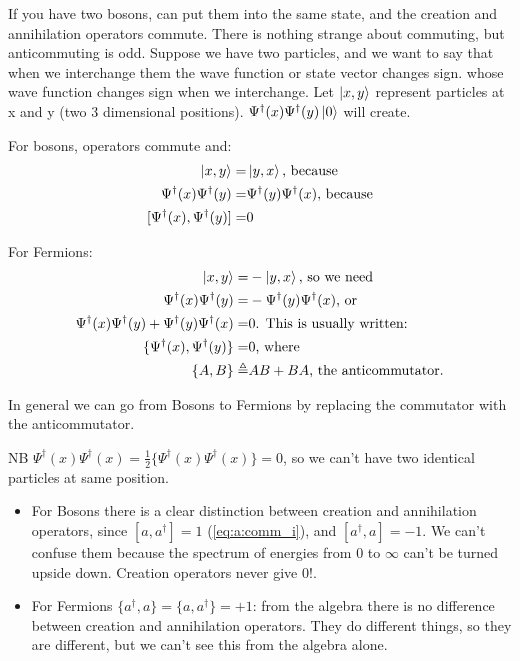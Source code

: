 \documentclass[]{article}
\begin{document}
If you have two bosons, can put them into the same state, and the creation and annihilation operators commute. There is nothing strange about commuting, but anticommuting is odd. Suppose we have two particles, and we want to say that when we interchange them the wave function or state vector changes sign.  whose wave function changes sign when we interchange. Let $\ket{x,y}$ represent particles at x and y (two 3 dimensional positions). $\Psi^\dagger(x)\Psi^\dagger(y)\ket{0}$ will create.

For bosons, operators commute and:
\begin{align*}
	\ket{x,y}=&\ket{y,x} \text{, because}\\
	\Psi^\dagger(x)\Psi^\dagger(y)=&\Psi^\dagger(y)\Psi^\dagger(x) \text{, because}\\
	[\Psi^\dagger(x),\Psi^\dagger(y)]=&0
\end{align*}

For Fermions:
\begin{align*}
	\ket{x,y}=&-\ket{y,x} \text{, so we need}\\
	\Psi^\dagger(x)\Psi^\dagger(y)=& -\Psi^\dagger(y)\Psi^\dagger(x) \text{, or}\\
	\Psi^\dagger(x)\Psi^\dagger(y)+\Psi^\dagger(y)\Psi^\dagger(x)=&0 \text{. This is usually written:}\\
	\{\Psi^\dagger(x), \Psi^\dagger(y)\}=&0 \text{, where}\\
	\{A,B\}\triangleq& AB + BA \text{, the anticommutator.}
\end{align*}

In general we can go from Bosons to Fermions by replacing the commutator with the anticommutator.

NB  $\Psi^\dagger(x)\Psi^\dagger(x)=\frac{1}{2}\{\Psi^\dagger(x)\Psi^\dagger(x)\}=0$,  so we can't have two identical particles at same position.

\begin{itemize}
	\item For Bosons there is a clear distinction between creation and annihilation operators, since $[a,a^\dagger]=1$ (\ref{eq:a:comm_i}), and $[a^\dagger,a]=-1$. We can't confuse them because the spectrum of energies from $0$ to $\infty$ can't be turned upside down. Creation operators never give 0!.
	\item For Fermions $\{a^\dagger,a\}= \{a,a^\dagger\}=+1$: from the algebra there is no difference between creation and annihilation operators. They do different things, so they are different, but we can't see this from the algebra alone.
\end{itemize}
\end{document}
